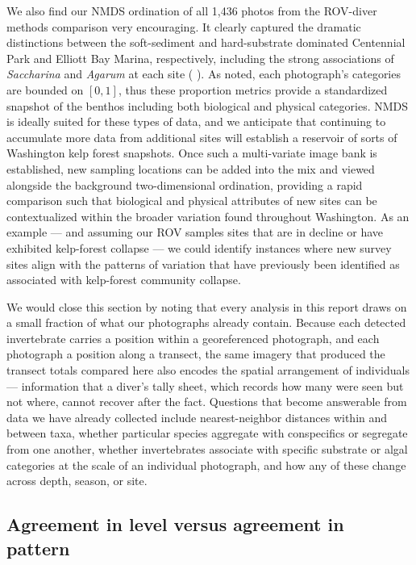 \documentclass[11pt]{article}
\newcommand{\boxedref}[2]{%
	\begingroup
	\setlength{\fboxrule}{0.8pt}%
	\setlength{\fboxsep}{1.5pt}%
	\textcolor{linkcyan}{%
		\fbox{%
			\textcolor{black}{%
				\hyperref[#2]{#1~\ref*{#2}}%
			}%
		}%
	}%
	\endgroup
}
\newcommand{\figref}[1]{\boxedref{Fig.}{#1}}\newcommand{\tabref}[1]{\boxedref{Table}{#1}}
\begin{document}
We also find our NMDS ordination of all 1{,}436 photos from the ROV-diver
methods comparison very encouraging.
It clearly captured the dramatic distinctions between the soft-sediment and
hard-substrate dominated Centennial Park and Elliott Bay Marina, respectively,
including the strong associations of \textit{Saccharina} and \textit{Agarum}
at each site (\figref{fig:NMDS}).
As noted, each photograph's categories are bounded on $[0,1]$, thus these
proportion metrics provide a standardized snapshot of the benthos including
both biological and physical categories.
NMDS is ideally suited for these types of data, and we anticipate that
continuing to accumulate more data from additional sites will establish a
reservoir of sorts of Washington kelp forest snapshots.
Once such a multi-variate image bank is established, new sampling locations
can be added into the mix and viewed alongside the background two-dimensional
ordination, providing a rapid comparison such that biological and physical
attributes of new sites can be contextualized within the broader variation
found throughout Washington.
As an example --- and assuming our ROV samples sites that are in decline or
have exhibited kelp-forest collapse --- we could identify instances where new
survey sites align with the patterns of variation that have previously been
identified as associated with kelp-forest community collapse.

We would close this section by noting that every analysis in this report draws
on a small fraction of what our photographs already contain.
Because each detected invertebrate carries a position within a georeferenced
photograph, and each photograph a position along a transect, the same imagery
that produced the transect totals compared here also encodes the spatial
arrangement of individuals --- information that a diver's tally sheet, which
records how many were seen but not where, cannot recover after the fact.
Questions that become answerable from data we have already collected include
nearest-neighbor distances within and between taxa, whether particular species
aggregate with conspecifics or segregate from one another, whether
invertebrates associate with specific substrate or algal categories at the
scale of an individual photograph, and how any of these change across depth,
season, or site.

\subsection{Agreement in level versus agreement in pattern}
\label{subsec:level_vs_pattern}
\end{document}
